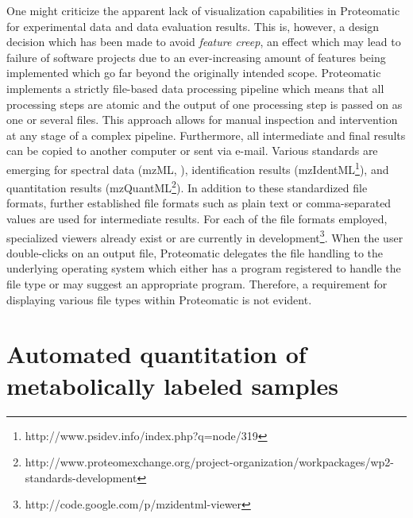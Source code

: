 One might criticize the apparent lack of visualization capabilities in 
Proteomatic for experimental data and data evaluation results.
This is, however, a design decision which has been made to avoid {\em feature 
creep}, an effect which may lead to failure of software projects due to
an ever-increasing amount of features being implemented which go far beyond the 
originally intended scope.
Proteomatic implements a strictly file-based data processing pipeline which
means that all processing steps are atomic and the output of one
processing step is passed on as one or several files.
This approach allows for manual inspection and intervention at any stage of
a complex pipeline.
Furthermore, all intermediate and final results can be copied to another 
computer or sent via e-mail.
Various standards are emerging for spectral data (mzML, \cite{Deutsch2008}), 
identification results (mzIdentML\footnote{http://www.psidev.info/index.php?q=node/319}), and quantitation results 
(mzQuantML\footnote{http://www.proteomexchange.org/project-organization/workpackages/wp2-standards-development}).
In addition to these standardized file formats, further established file 
formats such as plain text or comma-separated values are used for intermediate 
results.
For each of the file formats employed, specialized viewers already exist
or are currently in development\footnote{http://code.google.com/p/mzidentml-viewer}.
When the user double-clicks on an output file, Proteomatic delegates the
file handling to the underlying operating system which either has a program 
registered to handle the file type or may suggest an appropriate program.
Therefore, a requirement for displaying various file types within Proteomatic
is not evident.


% 


\section{Automated quantitation of metabolically labeled samples}

